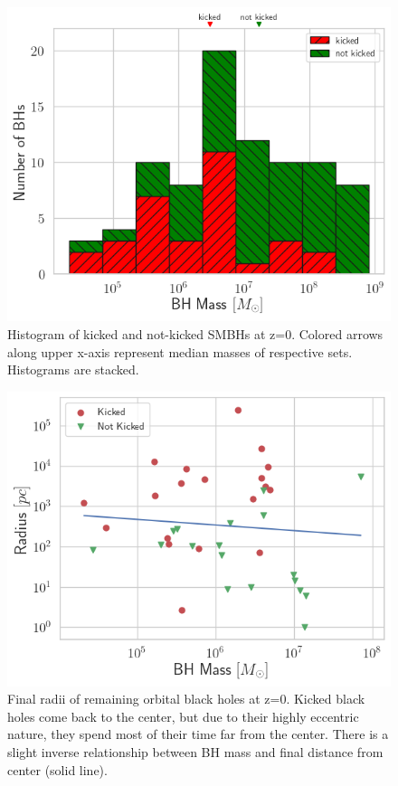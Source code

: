 \documentclass[fleqn,usenatbib,useAMS]{mnras}
\begin{document}
\begin{figure}
\begin{center}
\includegraphics[width=1.0\columnwidth]{plots/kicked_stats.png}
\caption{Histogram of kicked and not-kicked SMBHs at z=0.  Colored arrows along upper x-axis represent median masses of respective sets.  Histograms are stacked.}
\label{fig:kicked_stats}
\end{center}
\end{figure}

\begin{figure}
\begin{center}
\includegraphics[width=1.0\columnwidth]{plots/Final_Radius_v_Mass_of_Orbiting_BHs.png}
\caption{Final radii of remaining orbital black holes at z=0.  Kicked black holes come back to the center, but due to their highly eccentric nature, they spend most of their time far from the center.  There is a slight inverse relationship between BH mass and final distance from center (solid line).}
\label{fig:mvr}
\end{center}
\end{figure}
\end{document}
